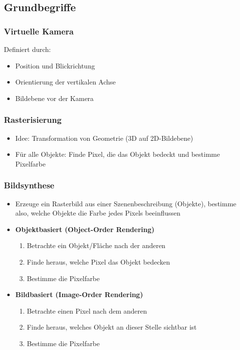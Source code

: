 \subsection{Grundbegriffe}

\subsubsection{Virtuelle Kamera}
Definiert durch:
\begin{itemize}
	\item Position und Blickrichtung
	\item Orientierung der vertikalen Achse
	\item Bildebene vor der Kamera
\end{itemize}

\subsubsection{Rasterisierung}
\begin{itemize}
	\item Idee: Transformation von Geometrie (3D auf 2D-Bildebene)
	\item Für alle Objekte: Finde Pixel, die das Objekt bedeckt und bestimme Pixelfarbe
\end{itemize}

\subsubsection{Bildsynthese}
\begin{itemize}
	\item Erzeuge ein Rasterbild aus einer Szenenbeschreibung (Objekte), bestimme also, welche Objekte die Farbe jedes Pixels beeinflussen
	\item \textbf{Objektbasiert (Object-Order Rendering)}
	\begin{enumerate}
		\item Betrachte ein Objekt/Fläche nach der anderen
		\item Finde heraus, welche Pixel das Objekt bedecken
		\item Bestimme die Pixelfarbe
	\end{enumerate}
	\item \textbf{Bildbasiert (Image-Order Rendering)}
	\begin{enumerate}
		\item Betrachte einen Pixel nach dem anderen
		\item Finde heraus, welches Objekt an dieser Stelle sichtbar ist
		\item Bestimme die Pixelfarbe
	\end{enumerate}
\end{itemize}

